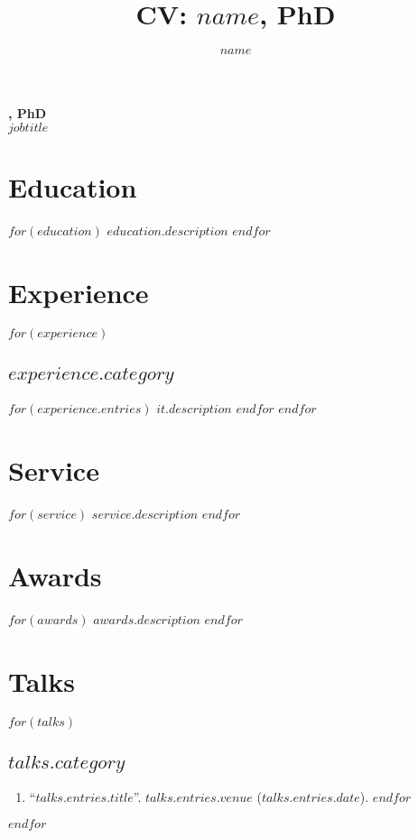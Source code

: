 \documentclass[11pt]{article}
\title{CV: $name$, PhD}
\author{$name$}
\date{}
\makeatletter
\renewcommand\maketitle{
    {\noindent\Large\sffamily\bfseries \@author, PhD\\
		\large\normalfont\itshape $jobtitle$}
  }
\makeatother
\begin{document}
%
\thispagestyle{empty}

\maketitle


\section{Education}
$for(education)$
$education.description$
$endfor$

\section{Experience}
$for(experience)$
\subsection{$experience.category$}
$for(experience.entries)$
$it.description$
$endfor$
$endfor$

\section{Service}
$for(service)$
$service.description$
$endfor$

\section{Awards}
$for(awards)$
$awards.description$
$endfor$

\section{Talks}
$for(talks)$
\subsection{$talks.category$}
\begin{enumerate}
$for(talks.entries)$
\item ``\href{$talks.entires.link$}{$talks.entries.title$}''. $talks.entries.venue$ ($talks.entries.date$).
$endfor$
\end{enumerate}
$endfor$
\end{document}
